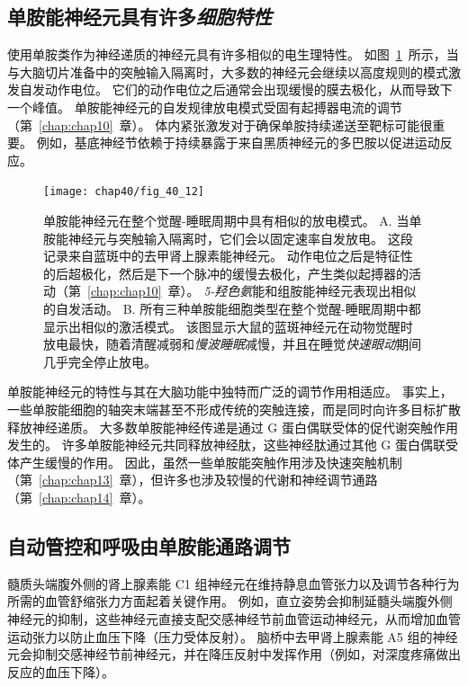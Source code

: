 \subsection{单胺能神经元具有许多\textit{细胞特性}}

使用单胺类作为神经递质的神经元具有许多相似的电生理特性。
如图~\ref{fig:40_12}~所示，当与大脑切片准备中的突触输入隔离时，大多数的神经元会继续以高度规则的模式激发自发动作电位。
它们的动作电位之后通常会出现缓慢的膜去极化，从而导致下一个峰值。
单胺能神经元的自发规律放电模式受固有起搏器电流的调节（第~\ref{chap:chap10}~章）。
体内紧张激发对于确保单胺持续递送至靶标可能很重要。
例如，基底神经节依赖于持续暴露于来自黑质神经元的多巴胺以促进运动反应。


\begin{figure}[htbp]
	\centering
	\texttt{[image: chap40/fig\_40\_12]}
	\caption{单胺能神经元在整个觉醒-睡眠周期中具有相似的放电模式。
		A. 当单胺能神经元与突触输入隔离时，它们会以固定速率自发放电。
		这段记录来自蓝斑中的去甲肾上腺素能神经元。
		动作电位之后是特征性的后超极化，然后是下一个脉冲的缓慢去极化，产生类似起搏器的活动（第~\ref{chap:chap10}~章）。
		\textit{5-羟色氨}能和组胺能神经元表现出相似的自发活动。
		B. 所有三种单胺能细胞类型在整个觉醒-睡眠周期中都显示出相似的激活模式。
		该图显示大鼠的蓝斑神经元在动物觉醒时放电最快，随着清醒减弱和\textit{慢波睡眠}减慢，并且在睡觉\textit{快速眼动}期间几乎完全停止放电\cite{aston1981activity}。}
	\label{fig:40_12}
\end{figure}


单胺能神经元的特性与其在大脑功能中独特而广泛的调节作用相适应。
事实上，一些单胺能细胞的轴突末端甚至不形成传统的突触连接，而是同时向许多目标扩散释放神经递质。
大多数单胺能神经传递是通过 G 蛋白偶联受体的促代谢突触作用发生的。
许多单胺能神经元共同释放神经肽，这些神经肽通过其他 G 蛋白偶联受体产生缓慢的作用。
因此，虽然一些单胺能突触作用涉及快速突触机制（第~\ref{chap:chap13}~章），但许多也涉及较慢的代谢和神经调节通路（第~\ref{chap:chap14}~章）。



\subsection{自动管控和呼吸由单胺能通路调节}

髓质头端腹外侧的肾上腺素能 C1 组神经元在维持静息血管张力以及调节各种行为所需的血管舒缩张力方面起着关键作用。
例如，直立姿势会抑制延髓头端腹外侧神经元的抑制，这些神经元直接支配交感神经节前血管运动神经元，从而增加血管运动张力以防止血压下降（压力受体反射）。
脑桥中去甲肾上腺素能 A5 组的神经元会抑制交感神经节前神经元，并在降压反射中发挥作用（例如，对深度疼痛做出反应的血压下降）。



